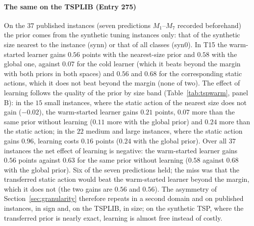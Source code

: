 \paragraph{The same on the TSPLIB (Entry 275)} On the $37$ published instances (seven predictions $M_1$--$M_7$ recorded beforehand) the prior comes from the synthetic tuning instances only: that of the synthetic size nearest to the instance (synn) or that of all classes (syn0). In T15 the warm-started learner gains $0.56$ points with the nearest-size prior and $0.58$ with the global one, against $0.07$ for the cold learner (which it beats beyond the margin with both priors in both spaces) and $0.56$ and $0.68$ for the corresponding static actions, which it does not beat beyond the margin (none of two). The effect of learning follows the quality of the prior by size band (Table~\ref{tab:tspwarm}, panel B): in the $15$ small instances, where the static action of the nearest size does not gain ($-0.02$), the warm-started learner gains $0.21$ points, $0.07$ more than the same prior without learning ($0.11$ more with the global prior) and $0.24$ more than the static action; in the $22$ medium and large instances, where the static action gains $0.96$, learning costs $0.16$ points ($0.24$ with the global prior). Over all $37$ instances the net effect of learning is negative: the warm-started learner gains $0.56$ points against $0.63$ for the same prior without learning ($0.58$ against $0.68$ with the global prior). Six of the seven predictions held; the miss was that the transferred static action would beat the warm-started learner beyond the margin, which it does not (the two gains are $0.56$ and $0.56$). The asymmetry of Section~\ref{sec:granularity} therefore repeats in a second domain and on published instances, in sign and, on the TSPLIB, in size; on the synthetic TSP, where the transferred prior is nearly exact, learning is almost free instead of costly.







